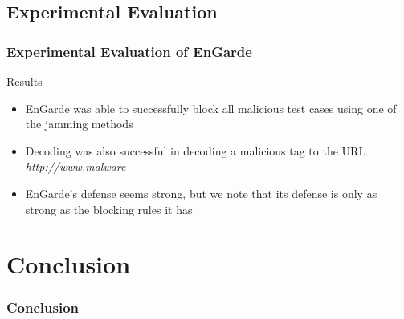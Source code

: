 \documentclass[unknownkeysallowed]{beamer}
\begin{document}

\subsection{Experimental Evaluation}

\begin{frame}
\frametitle{Experimental Evaluation of EnGarde}
  \begin{center}
  \begin{minipage}{.9\textwidth}
  \begin{block}{Results}
    \begin{itemize}
      \item{EnGarde was able to successfully block all malicious test cases using one of the jamming methods}
      \pause
      \vspace{1mm}
      \item{Decoding was also successful in decoding a malicious tag to the URL \textit{http://www.malware}}
      \pause
      \vspace{1mm}
      \item{EnGarde's defense seems strong, but we note that its defense is only as strong as the blocking rules it has}
    \end{itemize}
  \end{block}
  \end{minipage}
  \end{center}
\end{frame}

\section{Conclusion}
\begin{frame}
\frametitle{Conclusion}
\begin{center}\begin{minipage}{.9\textwidth}
\tableofcontents[currentsubsection, hideothersubsections, sectionstyle=show/shaded]
\end{minipage}\end{center}
\end{frame}
%
\end{document}
